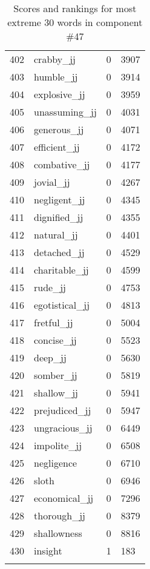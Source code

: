 \begin{longtable}[!htbp]{| rlr@{.}l |}
    402 & crabby\_jj & 0 & 3907 \\
    403 & humble\_jj & 0 & 3914 \\
    404 & explosive\_jj & 0 & 3959 \\
    405 & unassuming\_jj & 0 & 4031 \\
    406 & generous\_jj & 0 & 4071 \\
    407 & efficient\_jj & 0 & 4172 \\
    408 & combative\_jj & 0 & 4177 \\
    409 & jovial\_jj & 0 & 4267 \\
    410 & negligent\_jj & 0 & 4345 \\
    411 & dignified\_jj & 0 & 4355 \\
    412 & natural\_jj & 0 & 4401 \\
    413 & detached\_jj & 0 & 4529 \\
    414 & charitable\_jj & 0 & 4599 \\
    415 & rude\_jj & 0 & 4753 \\
    416 & egotistical\_jj & 0 & 4813 \\
    417 & fretful\_jj & 0 & 5004 \\
    418 & concise\_jj & 0 & 5523 \\
    419 & deep\_jj & 0 & 5630 \\
    420 & somber\_jj & 0 & 5819 \\
    421 & shallow\_jj & 0 & 5941 \\
    422 & prejudiced\_jj & 0 & 5947 \\
    423 & ungracious\_jj & 0 & 6449 \\
    424 & impolite\_jj & 0 & 6508 \\
    425 & negligence & 0 & 6710 \\
    426 & sloth & 0 & 6946 \\
    427 & economical\_jj & 0 & 7296 \\
    428 & thorough\_jj & 0 & 8379 \\
    429 & shallowness & 0 & 8816 \\
    430 & insight & 1 & 183 \\
    \hline
    \caption{Scores and rankings for most extreme 30 words in component \#47} \\
\end{longtable}
